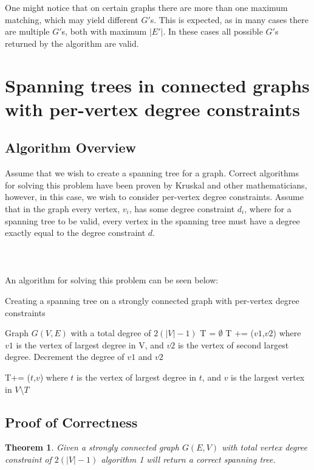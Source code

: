 \documentclass{article}
\begin{document}
	One might notice that on certain graphs there are more than one maximum matching, which may yield different $G'$s. This is expected, as in many cases there are multiple $G'$s, both with maximum $|E'|$. In these cases all possible $G'$s returned by the algorithm are valid.

	\newtheorem{theorem}{Theorem}
	\section{Spanning trees in connected graphs with per-vertex degree constraints}
	\subsection{Algorithm Overview}
	Assume that we wish to create a spanning tree for a graph. Correct algorithms for solving this problem have been proven by Kruskal and other
	mathematicians, however, in this case, we wish to consider per-vertex degree constraints. Assume that in the graph every vertex, $v_{i}$, has some degree constraint $d_{i}$,
	where for a spanning tree to be valid, every vertex in the spanning tree must have a degree exactly equal to the degree constraint $d$. 
	\\\\\\\\
	
	An algorithm for solving this problem can be seen below:
	\\

		\begin{algorithm}[H]
		\caption{Creating a spanning tree on a strongly connected graph with per-vertex degree constraints}
		\begin{algorithmic}[1]
			\State Graph $G(V,E)$ with a total degree of $2(|V|-1)$
			\State T = $\emptyset$
			\State T += ($v1$,$v2$) where $v1$ is the vertex of largest degree in V, and $v2$ is the vertex of second largest degree. Decrement the degree of $v1$ and $v2$
			\State \parbox[t]{\dimexpr\linewidth-\algorithmicindent}{T+= ($t$,$v$) where $t$ is the vertex of largest degree in $t$, and $v$ is the largest vertex in $V$\textbackslash$T$\strut}
			\EndWhile
		\end{algorithmic}
	\newpage
	\end{algorithm}
	\subsection{Proof of Correctness}
	\begin{theorem}
		Given a strongly connected graph $G(E,V)$ with total vertex degree constraint of $2(|V|-1)$ algorithm 1 will return a correct spanning tree.
	\end{theorem}
\end{document}
